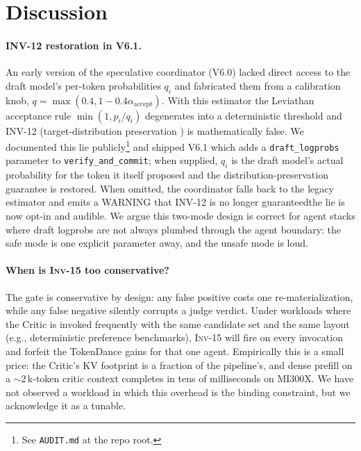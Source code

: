 \documentclass[10pt,twocolumn]{article}
\newcommand{\INV}[1]{\textsc{Inv-#1}}
\newcommand{\code}[1]{\texttt{\small #1}}
\begin{document}
\section{Discussion}
\label{sec:discussion}

\paragraph{INV-12 restoration in V6.1.}
\label{sec:discussion:inv12}
An early version of the speculative coordinator (V6.0) lacked direct
access to the draft model's per-token probabilities $q_i$ and
fabricated them from a calibration knob,
$q = \max(0.4, 1 - 0.4 \alpha_{\text{accept}})$. With this estimator
the Leviathan acceptance rule $\min(1, p_i / q_i)$ degenerates into a
deterministic threshold and INV-12 (target-distribution preservation
\cite{vllm}) is mathematically false. We documented this lie
publicly\footnote{See \texttt{AUDIT.md} at the repo root.} and shipped
V6.1 which adds a \code{draft\_logprobs} parameter to
\texttt{verify\_and\_commit}; when supplied, $q_i$ is the draft
model's actual probability for the token it itself proposed and the
distribution-preservation guarantee is restored. When omitted, the
coordinator falls back to the legacy estimator and emits a
WARNING that INV-12 is no longer guaranteed\textemdash the lie is now
opt-in and audible. We argue this two-mode design is correct for
agent stacks where draft logprobs are not always plumbed through the
agent boundary: the safe mode is one explicit parameter away, and the
unsafe mode is loud.

\paragraph{When is \INV{15} too conservative?}
The gate is conservative by design: any false positive costs one
re-materialization, while any false negative silently corrupts a judge
verdict. Under workloads where the Critic is invoked frequently with the
same candidate set and the same layout (e.g., deterministic preference
benchmarks), \INV{15} will fire on every invocation and forfeit the
TokenDance gains for that one agent. Empirically this is a small price:
the Critic's KV footprint is a fraction of the pipeline's, and dense
prefill on a $\sim\!2\,\mathrm{k}$-token critic context completes in tens
of milliseconds on MI300X. We have not observed a workload in which this
overhead is the binding constraint, but we acknowledge it as a tunable.
\end{document}

